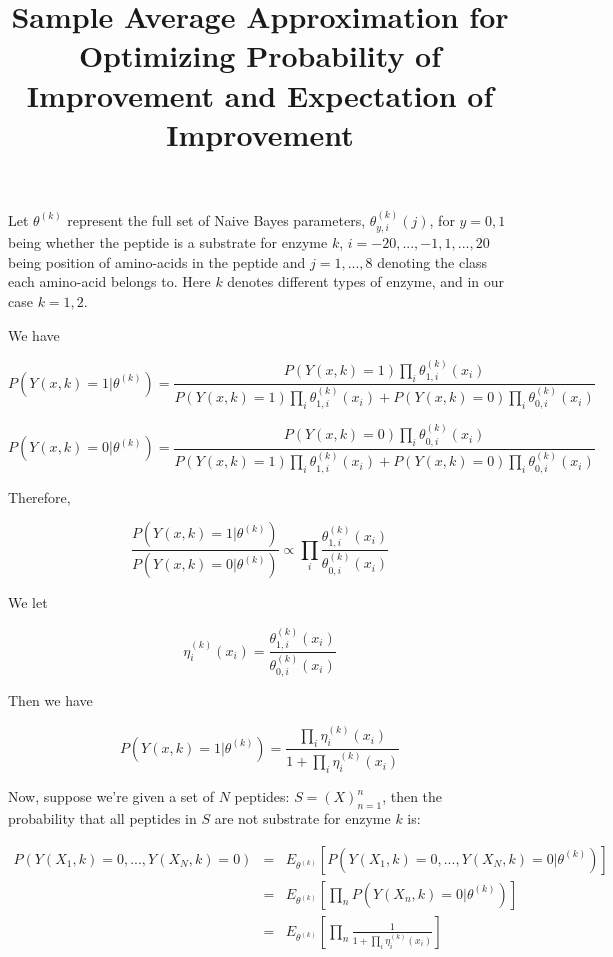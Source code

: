 \documentclass[12pt]{article}
\title{Sample Average Approximation for Optimizing Probability of Improvement and Expectation of Improvement}
\begin{document}
\maketitle

Let $\theta^{(k)}$ represent the full set of Naive Bayes parameters, $\theta_{y,i}^{(k)}(j)$, for $y=0,1$ being whether the peptide is a substrate for enzyme $k$, $i=-20,...,-1,1,...,20$ being position of amino-acids in the peptide and $j=1,...,8$ denoting the class each amino-acid belongs to. Here $k$ denotes different types of enzyme, and in our case $k=1,2$.

We have

\begin{equation*}
P(Y(x,k)=1|\theta^{(k)})=\frac{P(Y(x,k)=1)\prod_i\theta_{1,i}^{(k)}(x_i)}{P(Y(x,k)=1)\prod_i\theta_{1,i}^{(k)}(x_i)+P(Y(x,k)=0)\prod_i\theta_{0,i}^{(k)}(x_i)}
\end{equation*}

\begin{equation*}
P(Y(x,k)=0|\theta^{(k)})=\frac{P(Y(x,k)=0)\prod_i\theta_{0,i}^{(k)}(x_i)}{P(Y(x,k)=1)\prod_i\theta_{1,i}^{(k)}(x_i)+P(Y(x,k)=0)\prod_i\theta_{0,i}^{(k)}(x_i)}
\end{equation*}

Therefore,

\begin{equation*}
\frac{P(Y(x,k)=1|\theta^{(k)})}{P(Y(x,k)=0|\theta^{(k)})} \propto \prod_i\frac{\theta_{1,i}^{(k)}(x_i)}{\theta_{0,i}^{(k)}(x_i)}
\end{equation*}

We let

\begin{equation*}
\eta_i^{(k)}(x_i) = \frac{\theta_{1,i}^{(k)}(x_i)}{\theta_{0,i}^{(k)}(x_i)}
\end{equation*}

Then we have

\begin{equation*}
P(Y(x,k)=1|\theta^{(k)})=\frac{\prod_i\eta_i^{(k)}(x_i)}{1+\prod_i\eta_i^{(k)}(x_i)}
\end{equation*}

Now, suppose we're given a set of $N$ peptides: $S=(X)_{n=1}^n$, then the probability that all peptides in $S$ are not substrate for enzyme $k$ is:

\begin{eqnarray*}
P(Y(X_1,k)=0,...,Y(X_N,k)=0) & = & E_{\theta^{(k)}}[P(Y(X_1,k)=0,...,Y(X_N,k)=0|\theta^{(k)})] \\
                             & = & E_{\theta^{(k)}}[\prod_nP(Y(X_n,k)=0|\theta^{(k)})] \\
                             & = & E_{\theta^{(k)}}[\prod_n\frac{1}{1+\prod_i\eta_i^{(k)}(x_i)}]
\end{eqnarray*}
\end{document}
